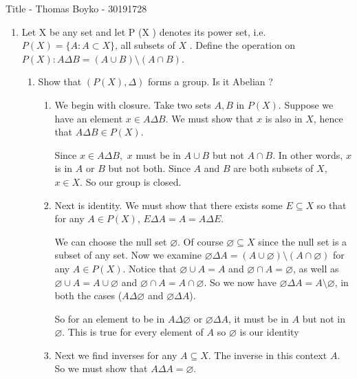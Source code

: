 \documentclass{article}
\begin{document}
    \huge Title - Thomas Boyko - 30191728
    \normalsize
\begin{enumerate} 

    \item Let X be any set and let P (X ) denotes its power set, i.e.
$P(X) = \{A : A \subset X \}$, all subsets of $X$ .
Define the operation on $P (X ) : A\Delta B = (A \cup B) \setminus (A \cap B)$.
\begin{enumerate}[label= (\alph*)] 
    \item Show that $(P (X ), \Delta)$ forms a group. Is it Abelian ?
        
        \begin{enumerate}[label= (\roman*)]
        \item   We begin with closure. Take two sets $A,B$ in $P(X)$. Suppose we have an 
            element $x \in A\Delta B$. 
            We must show that $x$ is also in $X$, hence that $A\Delta B\in P(X)$.

            Since $x\in A\Delta B,$ $x$ must be in $A\cup B$ but not $A\cap B$. In other words,
            $x$ is in $A$ or $B$ but not both. Since $A$ and $B$ are both subsets of $X$,
            $x\in X$. So our group is closed.

        \item Next is identity. We must show that there exists some $E\subseteq X$ so that for 
            any $A\in P(X)$, $E\Delta A=A=A\Delta E$.

            We can choose the null set $\varnothing$. Of course $\varnothing\subseteq X$ since 
            the null set is a subset of any set. Now we examine 
            $\varnothing\Delta A=(A\cup \varnothing)\setminus(A\cap \varnothing)$ for any
            $A\in P(X)$. Notice that $\varnothing\cup A=A$ and $\varnothing\cap A=\varnothing$, as 
            well as $\varnothing\cup A=A\cup \varnothing$ and $\varnothing\cap A=A\cap \varnothing$.
            So we now have $\varnothing\Delta A=A\setminus\varnothing$, in both the cases 
            ($A\Delta \varnothing$ and $\varnothing\Delta A$). 

            So for an element to be in $A\Delta \varnothing$ or $\varnothing\Delta A$, it must 
            be in $A$ but not in $\varnothing$. This is true for every element of $A$ so
            $\varnothing$ is our identity
            
        \item Next we find inverses for any $A\subseteq X$. The inverse
            in this context $A$. So we must show that $A\Delta A=\varnothing$.


\end{enumerate}
\end{enumerate}
\end{enumerate}
\end{document}
